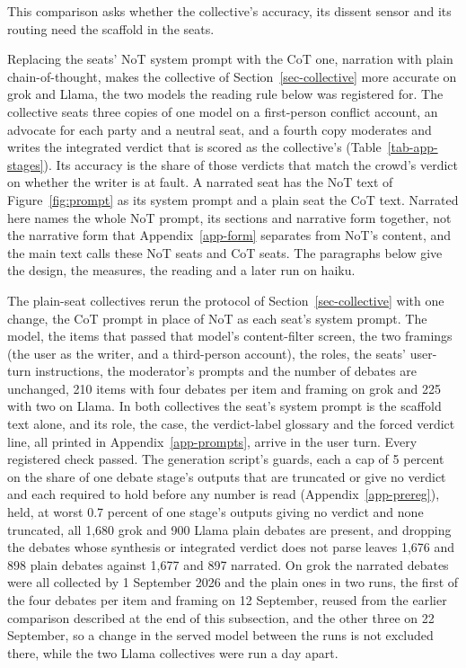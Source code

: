 This comparison asks whether the collective's accuracy, its dissent sensor
and its routing need the scaffold in the seats.

Replacing the seats' NoT system prompt with the CoT one, narration with
plain chain-of-thought, makes the
collective of Section~\ref{sec-collective} more accurate on grok and Llama,
the two models the reading rule below was registered for. The collective
seats three copies of one model on a first-person conflict account, an
advocate for each party and a neutral seat, and a fourth copy moderates and
writes the integrated verdict that is scored as the collective's
(Table~\ref{tab-app-stages}). Its accuracy is the share of those verdicts
that match the crowd's verdict on whether the writer is at fault. A narrated
seat has the NoT text of Figure~\ref{fig:prompt} as its system prompt and a
plain seat the CoT text. Narrated here names the whole NoT prompt, its
sections and narrative form together, not the narrative form that
Appendix~\ref{app-form} separates from NoT's content, and the main text calls
these NoT seats and CoT seats.
The paragraphs below give the design, the measures,
the reading and a later run on haiku.

The plain-seat collectives
rerun the protocol of Section~\ref{sec-collective} with one change, the CoT
prompt in place of NoT as each seat's system prompt. The model, the items
that passed that model's content-filter screen, the two framings (the user
as the writer, and a third-person account), the roles, the seats' user-turn
instructions, the moderator's prompts and the number of debates are
unchanged, 210 items with four debates per item and framing on grok and 225
with two on Llama.
In both collectives the seat's system prompt is the scaffold text alone, and
its role, the case, the verdict-label glossary and the forced verdict line,
all printed in Appendix~\ref{app-prompts}, arrive in the user turn.
Every registered check passed. The generation script's guards, each a cap of
5 percent on the share of one debate stage's outputs that are truncated or
give no verdict and each required to hold before any number is read
(Appendix~\ref{app-prereg}), held, at worst 0.7 percent of one stage's
outputs giving no verdict and none truncated, all 1,680 grok and 900
Llama plain debates are present, and dropping the debates whose synthesis or
integrated verdict does not parse leaves 1,676 and 898 plain debates against
1,677 and 897 narrated.
On grok the narrated debates were all collected by 1 September 2026 and the
plain ones in two runs, the first of the four debates per item and framing
on 12 September, reused from the earlier comparison described at the end of
this subsection, and the other three on 22 September, so a change in the
served model between the runs is not excluded there, while the two Llama
collectives were run a day apart.


